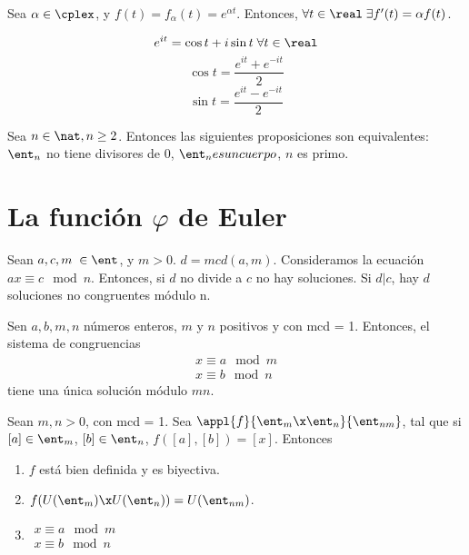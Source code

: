 \documentclass[nochap]{apuntes}
\begin{document}
\begin{theorem}
Sea $\alpha \in \cplex$, y $f(t)=f_\alpha (t)=e^{\alpha t}$. Entonces, $\forall t \in \real\;\exists f'(t)=\alpha f(t)$.
\end{theorem}

\begin{theorem}
\[e^{it}=\cos t + i \sin t \; \forall t \in \real \]
\[ \cos t = \frac{e^{it}+e^{-it}}{2} \]
\[ \sin t = \frac{e^{it}-e^{-it}}{2} \]
\end{theorem}

\begin{theorem}
Sea $n\in \nat, n\geq 2$. Entonces las siguientes proposiciones son equivalentes: $\ent_n$ no tiene divisores de 0, $\ent_n es un cuerpo$, $n$ es primo.
\end{theorem}

\section{La función $\varphi$ de Euler}

\begin{theorem}
Sean $a,c,m\;\in\ent$, y $m>0$. $d=mcd(a,m)$. Consideramos la ecuación $ax\equiv c \mod n$. Entonces, si $d$ no divide a $c$ no hay soluciones. Si $d|c$, hay $d$ soluciones no congruentes módulo n.
\end{theorem}

\begin{theorem}
Sen $a,b,m,n$ números enteros, $m$ y $n$ positivos y con mcd = 1. Entonces, el sistema de congruencias
\[\begin{matrix}
x\equiv a \mod m \\
x\equiv b \mod n 
\end{matrix}\] tiene una única solución módulo $mn$.
\end{theorem}

\begin{lemma}
Sean $m,n>0$, con mcd = 1. Sea $\appl{f}{\ent_m\x\ent_n}{\ent_{nm}}$, tal que si $[a] \in \ent_m$, $[b] \in \ent_n$, $f([a],[b])=[x]$. Entonces \begin{enumerate}
\item $f$ está bien definida y es biyectiva.
\item $f(U(\ent_m)\x U (\ent_n))=U(\ent_{nm})$.
\item $\begin{matrix}
x\equiv a \mod m \\
x\equiv b \mod n 
\end{matrix}$
\end{enumerate}
\end{lemma}
\end{document}
